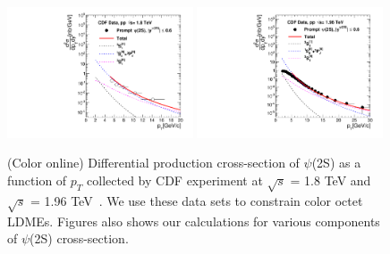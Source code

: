 \documentclass[aps,prc,preprint,superscriptaddress,showpacs,showkeys,amsmath]{revtex4-1}
\begin{document}
\begin{figure}
\includegraphics[width=0.49\textwidth]{Figures/Psi2S/Psi2S_CDF_180TeV.pdf}
\includegraphics[width=0.49\textwidth]{Figures/Psi2S/Psi2S_CDF_196TeV.pdf}
\caption{(Color online) Differential production cross-section of $\psi$(2S) as
 a function of $p_{T}$ collected by CDF experiment at $\sqrt{s}$ = 1.8 TeV and 
$\sqrt{s}$ = 1.96 TeV~\cite{Acosta:2004yw}. We use these data sets to constrain 
color octet LDMEs. Figures also shows our calculations for various components 
of $\psi$(2S) cross-section.}
\label{Fig:LDMEPsi2SCDF}
\end{figure}
\end{document}

